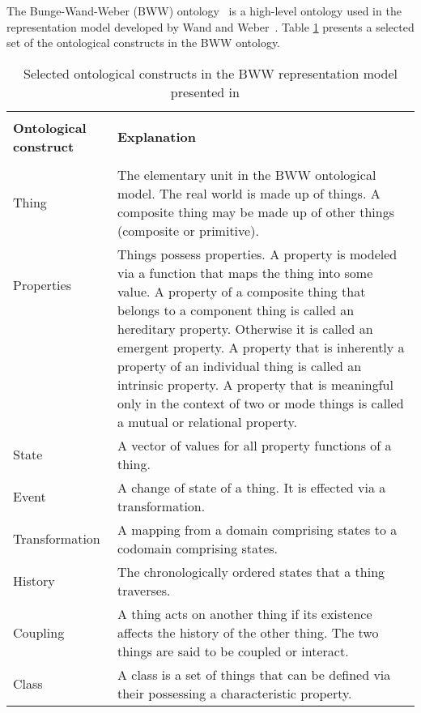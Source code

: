 \documentclass[parskip=full]{uvamscse}
\begin{document}
The Bunge-Wand-Weber (BWW) ontology~\cite{wand1990ontological} is a high-level ontology used in the
representation model developed by Wand and Weber~\cite{wand1995deep}. Table \ref{tab:bwwmodel}
presents a selected set of the ontological constructs in the BWW ontology.

\begin{center}
\begin{longtable}{ | p{11em} | p{30em} | } 
\caption{Selected ontological constructs in the BWW representation model presented in ~\cite{wand1995deep}}
\label{tab:bwwmodel}\\
\hline
 &  \\
\textbf{Ontological construct} & \textbf{Explanation} \\
 &  \\
\hline
Thing & The elementary unit in the BWW ontological model. The real world is made up of things. A composite thing may be made up of other things (composite or primitive). \\ 
\hline
Properties & \multirow{7}{30em}{Things possess properties. A property is modeled via a function that maps the thing into some value. A property of a composite thing that belongs to a component thing is called an hereditary property. Otherwise it is called an emergent property. A property that is inherently a property of an individual thing is called an intrinsic property. A property that is meaningful only in the context of two or mode things is called a mutual or relational property.} \\ 
 &  \\ 
 &  \\
 &  \\
 &  \\
 &  \\
 &  \\
 \hline
 State & A vector of values for all property functions of a thing. \\
 \hline
 Event & A change of state of a thing. It is effected via a transformation. \\
 \hline
 Transformation & A mapping from a domain comprising states to a codomain comprising states. \\
 \hline
 History & The chronologically ordered states that a thing traverses. \\
 \hline
 Coupling & A thing acts on another thing if its existence affects the history of the other thing. The two things are said to be coupled or interact. \\
 \hline
 Class & A class is a set of things that can be defined via their possessing a characteristic property. \\ 

\end{longtable}
\end{center}
\end{document}

